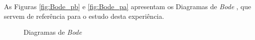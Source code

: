 As Figuras \ref{fig:Bode_pb} e \ref{fig:Bode_pa} apresentam os Diagramas de \textit{Bode} , que servem de referência para o estudo desta experiência. 

\begin{figure}[hbtp]
	\centering%
		\centering
		\qquad
		\caption{Diagramas de \textit{Bode}  \cite{sedrasmith}}%
		\label{fig:Bodeesqgeral}%
\end{figure}

